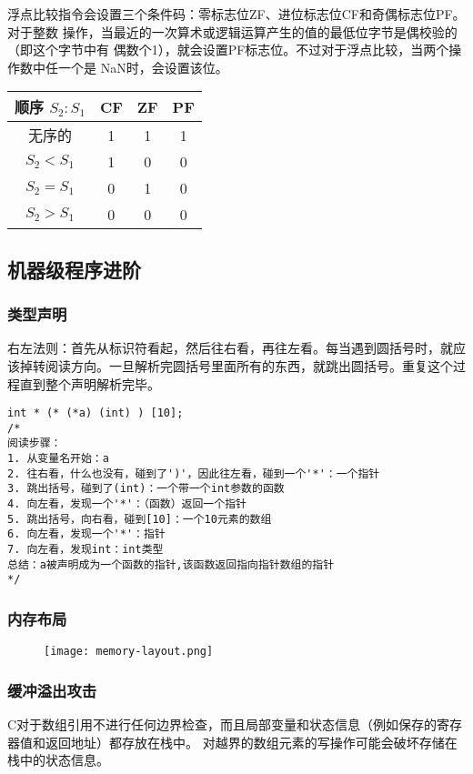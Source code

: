 浮点比较指令会设置三个条件码：零标志位ZF、进位标志位CF和奇偶标志位PF。对于整数
操作，当最近的一次算术或逻辑运算产生的值的最低位字节是偶校验的（即这个字节中有
偶数个1），就会设置PF标志位。不过对于浮点比较，当两个操作数中任一个是
NaN时，会设置该位。
\begin{table}[H]
    \centering
    \begin{tabular}{|c|c|c|c|}
        \hline
        顺序 $S_2:S_1$ & CF & ZF & PF \\
        \hline
        无序的          & 1  & 1  & 1  \\
        \hline
        $S_2 < S_1$  & 1  & 0  & 0  \\
        \hline
        $S_2 = S_1$  & 0  & 1  & 0  \\
        \hline
        $S_2 > S_1$  & 0  & 0  & 0  \\
        \hline
    \end{tabular}
\end{table}


\subsection{机器级程序进阶}
\subsubsection{类型声明}

右左法则：首先从标识符看起，然后往右看，再往左看。每当遇到圆括号时，就应该掉转阅读方向。一旦解析完圆括号里面所有的东西，就跳出圆括号。重复这个过程直到整个声明解析完毕。
\begin{lstlisting}[style=CStyle]
int * (* (*a) (int) ) [10];
/*
阅读步骤：
1. 从变量名开始：a
2. 往右看，什么也没有，碰到了')'，因此往左看，碰到一个'*'：一个指针
3. 跳出括号，碰到了(int)：一个带一个int参数的函数
4. 向左看，发现一个'*'：（函数）返回一个指针
5. 跳出括号，向右看，碰到[10]：一个10元素的数组
6. 向左看，发现一个'*'：指针
7. 向左看，发现int：int类型
总结：a被声明成为一个函数的指针,该函数返回指向指针数组的指针
*/
\end{lstlisting}

\subsubsection{内存布局}
\begin{figure}[H]
    \centering
    \texttt{[image: memory-layout.png]}
\end{figure}

\subsubsection{缓冲溢出攻击}
C对于数组引用不进行任何边界检查，而且局部变量和状态信息（例如保存的寄存器值和返回地址）都存放在栈中。
对越界的数组元素的写操作可能会破坏存储在栈中的状态信息。

